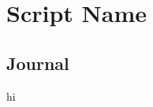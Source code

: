 \documentclass[../main.tex]{subfiles}
\begin{document}
\chapter{Script Name}\label{sct:6}
\section{Journal}
hi
\end{document}
